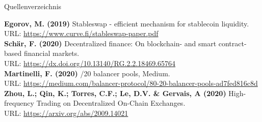 \documentclass{beamer}
\begin{document}
\begin{frame}{Quellenverzeichnis}
\begin{small}
\textbf{Egorov, M. (2019)} \glq Stableswap - efficient mechanism for stablecoin liquidity.\grq \\
URL: \url{https://www.curve.fi/stableswap-paper.pdf} \\
\vspace{1em}
\textbf{Schär, F. (2020)} \glq Decentralized finance: On blockchain- and smart contract-based financial markets.\grq \\
URL: \url{https://dx.doi.org/10.13140/RG.2.2.18469.65764} \\
\vspace{1em}
\textbf{Martinelli, F. (2020)} /20 balancer pools, Medium.\grq \\
URL: \url{https://medium.com/balancer-protocol/80-20-balancer-pools-ad7fed816c8d}\\
\vspace{1em}
\textbf{Zhou, L.; Qin, K.; Torres, C.F.; Le, D.V. \& Gervais, A (2020)} \glq High-frequency Trading on Decentralized On-Chain Exchanges.\grq \\
URL: \url{https://arxiv.org/abs/2009.14021}\\
\end{small}
\end{frame}
\end{document}
